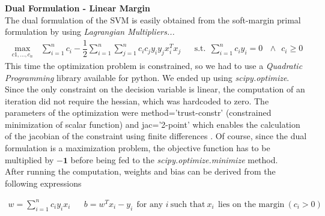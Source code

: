 \documentclass[12pt]{article}
\begin{document}
	\textbf{Dual Formulation - Linear Margin}\\
	The dual formulation of the SVM is easily obtained from the soft-margin primal formulation by using \textit{Lagrangian Multipliers...}
	\begin{align}
		\max_{c1,\dots, c_n}\ \ \ \sum_{i=1}^n{c_i} - \dfrac 1 2 \sum_{i=1}^n{\sum_{j=1}^n{c_i c_j y_i y_j x_i^Tx_j}} &&
		\nonumber \text{s.t.} \ \ \sum_{i=1}^n{c_iy_i} = 0\ \ \ \land \ \ c_i \ge 0
	\end{align}
	This time the optimization problem is constrained, so we had to use a \textit{Quadratic Programming} library available for python. We ended up using \textit{scipy.optimize}. Since the only constraint on the decision variable is linear, the computation of an iteration did not require the hessian, which was hardcoded to zero. The parameters of the optimization were method='trust-constr' (constrained minimization of scalar function) and jac='2-point' which enables the calculation of the jacobian of the constraint using finite differences \cite{docscipyopt}. Of course, since the dual formulation is a maximization problem, the objective function has to be multiplied by $\mathbf{-1}$ before being fed to the \textit{scipy.optimize.minimize} method.\\
	
	After running the computation, weights and bias can be derived from the following expressions
	
	\begin{align}
		w = \sum_{i=1}^n{c_iy_ix_i}&&
		b = w^Tx_i-y_i \ \ \text{for any } i\ \text{such that}\ x_i\ \ \text{lies on the margin}\  (c_i>0)
	\end{align}
	
\end{document}
